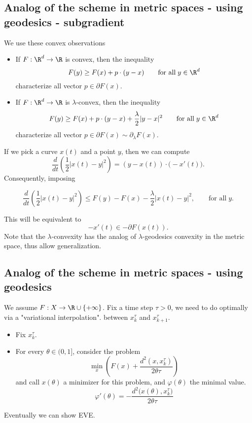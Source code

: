 \subsection{Analog of the scheme in metric spaces - using geodesics - subgradient}
We use these convex observations
\begin{itemize}
    \item If $F:\R^d\to \R$ is convex, then the inequality
        \begin{equation*}
            F(y)\geq F(x) + p\cdot (y-x) \qquad\text{for all}\;y\in \R^d
        \end{equation*}
        characterize all vector $p\in \partial F(x)$. 
    \item If $F:\R^d\to \R$ is $\lambda$-convex, then the inequality
        \begin{equation*}
            F(y)\geq F(x) + p\cdot (y-x) + \frac{\lambda}{2}|y-x|^2 \qquad\text{for all}\;y\in \R^d
        \end{equation*}
        characterize all vector $p\in \partial F(x) \sim \partial_\lambda F(x)$. 
\end{itemize}
If we pick a curve $x(t)$ and a point $y$, then we can compute
\begin{equation*}
    \frac{d}{dt}\left(\frac{1}{2}|x(t)-y|^2\right) = (y-x(t))\cdot \big(-x'(t)\big).
\end{equation*}
Consequently, imposing
\begin{defn}
\begin{equation*}
    \frac{d}{dt}\left(\frac{1}{2}|x(t)-y|^2\right)  \leq F(y)-F(x)-\frac{\lambda}{2}|x(t)-y|^2, \qquad\text{for all}\;y.
\end{equation*}
\end{defn}
This will be equivalent to 
\begin{equation*}
    -x'(t)\in -\partial F(x(t)).
\end{equation*}
Note that the $\lambda$-convexity has the analog of $\lambda$-geodesics convexity in the metric space, thus allow generalization.

\subsection{Analog of the scheme in metric spaces - using geodesics}
We assume $F:X\to \R\cup \{+\infty\}$. Fix a time step $\tau>0$, we need to do optimally via a "variational interpolation". between $x^\tau_k$ and $x^\tau_{k+1}$.
\begin{itemize}
    \item Fix $x^\tau_k$.
    \item For every $\theta\in (0,1]$, consider the problem
    \begin{equation*}
        \min_x \left(F(x) + \frac{d^2(x,x^\tau_k)}{2\theta \tau}\right)
    \end{equation*}
    and call $x(\theta)$ a minimizer for this problem, and $\varphi(\theta)$ the minimal value.
    \begin{equation*}
        \varphi'(\theta) = -\frac{d^2\big(x(\theta), x^\tau_k\big)}{2\theta \tau}
    \end{equation*}
\end{itemize}
Eventually we can show EVE.
